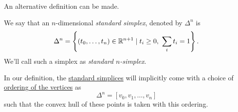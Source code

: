 An alternative definition can be made.
\begin{definition}\label{def:standard-simplex}
	We say that an \(n\)-dimensional \emph{standard simplex}, denoted by \(\Delta^n\) is
	\[
		\Delta^n = \left\{(t_0, \ldots , t_{n}) \in \mathbb{\MakeUppercase{r}}^{n+1} \mid t_i \geq 0,\ \sum\limits_{i}t_{i}  = 1 \right\}.
	\]
	We'll call such a simplex as \emph{standard \(n\)-simplex}.
	\begin{figure}[H]
		\centering
		\label{fig:def:standard-simplex}
	\end{figure}
\end{definition}
\begin{remark}
	In our definition, the \hyperref[def:standard-simplex]{standard simplices} will implicitly come with a choice of \underline{ordering of the vertices} as
	\[
		\Delta ^n = [v_0, v_1, \ldots , v_n ]
	\]
	such that the convex hull of these points is taken with this ordering.
\end{remark}